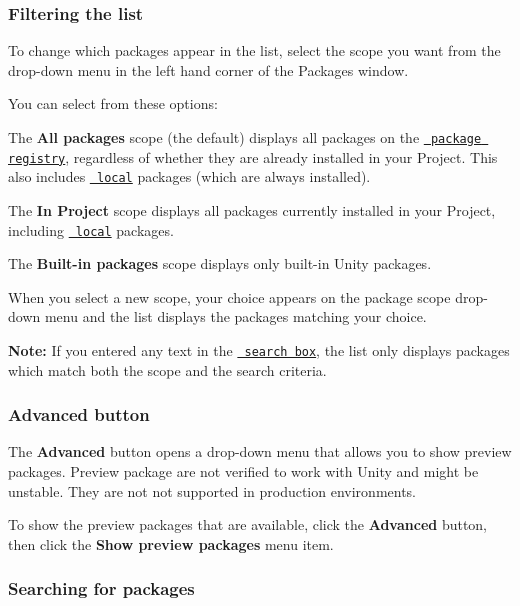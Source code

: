 \label{_scope}%
 \subsubsection*{Filtering the list}

To change which packages appear in the list, select the scope you want from the drop-\/down menu in the left hand corner of the Packages window.

You can select from these options\+:


\begin{DoxyItemize}
\item The {\bfseries{All packages}} scope (the default) displays all packages on the \href{\#PackManRegistry}{\texttt{ package registry}}, regardless of whether they are already installed in your Project. This also includes \href{\#extpkg}{\texttt{ local}} packages (which are always installed).
\item The {\bfseries{In Project}} scope displays all packages currently installed in your Project, including \href{\#extpkg}{\texttt{ local}} packages.
\item The {\bfseries{Built-\/in packages}} scope displays only built-\/in Unity packages.
\end{DoxyItemize}

When you select a new scope, your choice appears on the package scope drop-\/down menu and the list displays the packages matching your choice.

{\bfseries{Note\+:}} If you entered any text in the \href{\#searchText}{\texttt{ search box}}, the list only displays packages which match both the scope and the search criteria.

\label{_advanced}%
 \subsubsection*{Advanced button}

The {\bfseries{Advanced}} button opens a drop-\/down menu that allows you to show preview packages. Preview package are not verified to work with Unity and might be unstable. They are not not supported in production environments.

To show the preview packages that are available, click the {\bfseries{Advanced}} button, then click the {\bfseries{Show preview packages}} menu item.

\label{_searchText}%
 \subsubsection*{Searching for packages}

